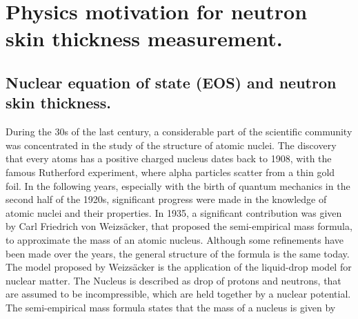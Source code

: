 
\chapter{Physics motivation for neutron skin thickness measurement.} \label{intro}

\section{Nuclear equation of state (EOS) and neutron skin thickness.}


During the 30s of the last century, a considerable part of the scientific community was concentrated in the study of the structure of atomic nuclei. The discovery that every atoms has a positive charged nucleus dates back to 1908, with the famous Rutherford experiment, where alpha particles scatter from a thin gold foil. In the following years, especially with the birth of quantum mechanics in the second half of the 1920s, significant progress were made in the knowledge of atomic nuclei and their properties. In 1935, a significant contribution was given by Carl Friedrich von Weizsäcker, that proposed the semi-empirical mass formula, to approximate the mass of an atomic nucleus. Although some refinements have been made over the years, the general structure of the formula is the same today. 
The model proposed by Weizsäcker is the application of the liquid-drop model for nuclear matter. The Nucleus is described as drop of protons and neutrons, that are assumed to be incompressible, which are held together by a nuclear potential. The semi-empirical mass formula states that the mass of a nucleus is given by 

